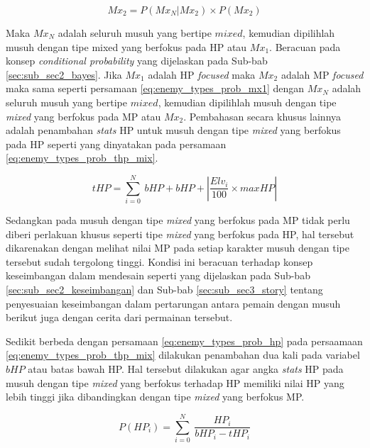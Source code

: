 \begin{equation}\label{eq:enemy_types_prob_mx2}
Mx_{2} = P(Mx_{{N}}|Mx_{2}) \times P(Mx_{2})
\end{equation}

Maka $Mx_{N}$ adalah seluruh musuh yang bertipe $mixed$, kemudian dipilihlah musuh dengan tipe mixed yang berfokus pada HP atau $Mx_{1}$. Beracuan pada konsep \textit{conditional probability} yang dijelaskan pada Sub-bab \ref{sec:sub_sec2_bayes}. Jika $Mx_{1}$ adalah HP \textit{focused} maka  $Mx_{2}$ adalah MP \textit{focused} maka sama seperti persamaan \ref{eq:enemy_types_prob_mx1} dengan $Mx_{N}$ adalah seluruh musuh yang bertipe $mixed$, kemudian dipilihlah musuh dengan tipe \textit{mixed} yang berfokus pada MP atau $Mx_{2}$. Pembahasan secara khusus lainnya adalah penambahan \textit{stats} HP untuk musuh dengan tipe \textit{mixed} yang berfokus pada HP seperti yang dinyatakan pada persamaan \ref{eq:enemy_types_prob_thp_mix}. 
\vspace{1ex}

\begin{equation}\label{eq:enemy_types_prob_thp_mix}
tHP = \sum_{i=0}^{N}\ bHP + bHP + \left | \frac{Elv_{i}}{100} \times maxHP \right |
\end{equation}

Sedangkan pada musuh dengan tipe \textit{mixed} yang berfokus pada MP tidak perlu diberi perlakuan khusus seperti tipe \textit{mixed} yang berfokus pada HP, hal tersebut dikarenakan dengan melihat nilai MP pada setiap karakter musuh dengan tipe tersebut sudah tergolong tinggi. Kondisi ini beracuan terhadap konsep keseimbangan dalam mendesain seperti yang dijelaskan pada Sub-bab \ref{sec:sub_sec2_keseimbangan} dan Sub-bab \ref{sec:sub_sec3_story} tentang penyesuaian keseimbangan dalam pertarungan antara pemain dengan musuh berikut juga dengan cerita dari permainan tersebut.
\vspace{1ex}

Sedikit berbeda dengan persamaan \ref{eq:enemy_types_prob_hp} pada persaamaan \ref{eq:enemy_types_prob_thp_mix} dilakukan penambahan dua kali pada variabel $bHP$ atau batas bawah HP. Hal tersebut dilakukan agar angka \textit{stats} HP pada musuh dengan tipe \textit{mixed} yang berfokus terhadap HP memiliki nilai HP yang lebih tinggi jika dibandingkan dengan tipe \textit{mixed} yang berfokus MP.
\vspace{1ex}

\begin{equation}\label{eq:enemy_types_prob_hp_mix}
P(HP_{i}) = \sum_{i=0}^{N}\ \frac{HP_{i}}{bHP_{i} - tHP_{i}}
\end{equation}

